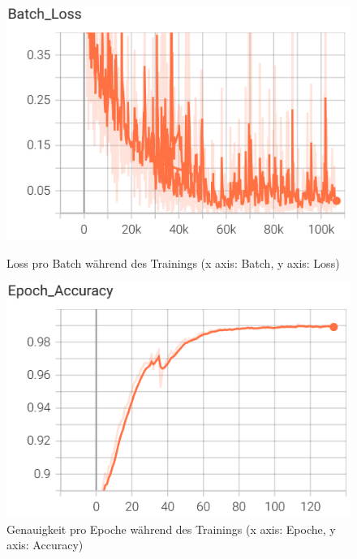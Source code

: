 \documentclass[11pt,a4paper]{article}
\begin{document}
\begin{figure}[H]
    \centering
    \begin{minipage}{0.48\textwidth}
        \includegraphics[width=\textwidth]{img/train/batch_loss.png}
        \caption{Loss pro Batch während des Trainings (x axis: Batch, y axis: Loss)}
        \label{fig:batch_loss}
    \end{minipage}\hfill
    \begin{minipage}{0.48\textwidth}
        \includegraphics[width=\textwidth]{img/train/epoch_accuracy.png}
        \caption{Genauigkeit pro Epoche während des Trainings (x axis: Epoche, y axis: Accuracy)}
        \label{fig:epoch_accuracy}
    \end{minipage}
\end{figure}
\end{document}
